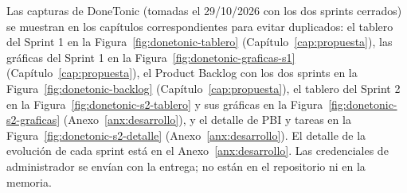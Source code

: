 Las capturas de DoneTonic (tomadas el 29/10/2026 con los dos sprints cerrados) se muestran en los capítulos correspondientes para evitar duplicados: el tablero del Sprint 1 en la Figura~\ref{fig:donetonic-tablero} (Capítulo~\ref{cap:propuesta}), las gráficas del Sprint 1 en la Figura~\ref{fig:donetonic-graficas-s1} (Capítulo~\ref{cap:propuesta}), el Product Backlog con los dos sprints en la Figura~\ref{fig:donetonic-backlog} (Capítulo~\ref{cap:propuesta}), el tablero del Sprint 2 en la Figura~\ref{fig:donetonic-s2-tablero} y sus gráficas en la Figura~\ref{fig:donetonic-s2-graficas} (Anexo~\ref{anx:desarrollo}), y el detalle de PBI y tareas en la Figura~\ref{fig:donetonic-s2-detalle} (Anexo~\ref{anx:desarrollo}). El detalle de la evolución de cada sprint está en el Anexo~\ref{anx:desarrollo}. Las credenciales de administrador se envían con la entrega; no están en el repositorio ni en la memoria.
